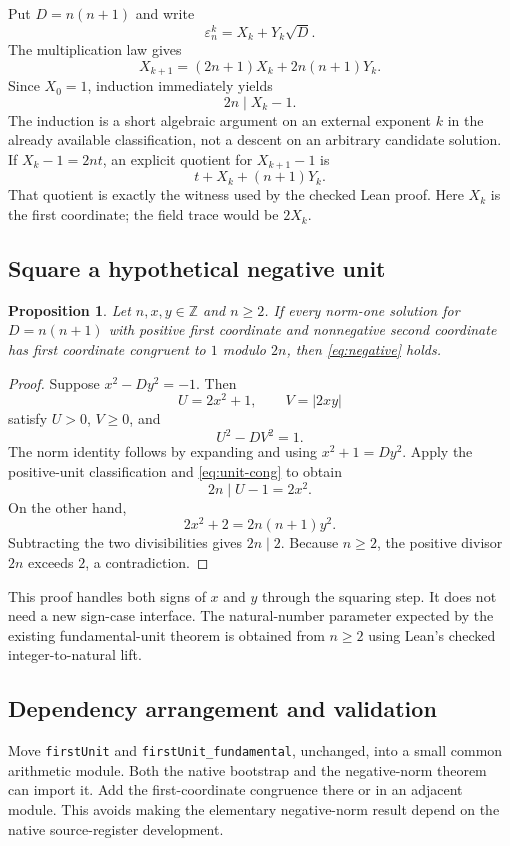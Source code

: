 \documentclass[11pt,letterpaper]{article}
\newcommand{\code}[1]{\nolinkurl{#1}}
\newcommand{\Z}{\mathbb Z}
\newtheorem{proposition}{Proposition}[section]
\begin{document}
Put $D=n(n+1)$ and write
\[
 \varepsilon_n^k=X_k+Y_k\sqrt D.
\]
The multiplication law gives
\[
 X_{k+1}=(2n+1)X_k+2n(n+1)Y_k.
\]
Since $X_0=1$, induction immediately yields
\begin{equation}
 2n\mid X_k-1. \label{eq:unit-cong}
\end{equation}
The induction is a short algebraic argument on an external exponent $k$ in the already available classification, not a descent on an arbitrary candidate solution. If $X_k-1=2nt$, an explicit quotient for $X_{k+1}-1$ is
\[
 t+X_k+(n+1)Y_k.
\]
That quotient is exactly the witness used by the checked Lean proof. Here $X_k$ is the first coordinate; the field trace would be $2X_k$.

\subsection{Square a hypothetical negative unit}

\begin{proposition}
Let $n,x,y\in\Z$ and $n\ge2$. If every norm-one solution for $D=n(n+1)$ with positive first coordinate and nonnegative second coordinate has first coordinate congruent to $1$ modulo $2n$, then \eqref{eq:negative} holds.
\end{proposition}
\begin{proof}
Suppose $x^2-Dy^2=-1$. Then
\[
 U=2x^2+1,\qquad V=|2xy|
\]
satisfy $U>0$, $V\ge0$, and
\[
 U^2-DV^2=1.
\]
The norm identity follows by expanding and using $x^2+1=Dy^2$. Apply the positive-unit classification and \eqref{eq:unit-cong} to obtain
\[
 2n\mid U-1=2x^2.
\]
On the other hand,
\[
 2x^2+2=2n(n+1)y^2.
\]
Subtracting the two divisibilities gives $2n\mid2$. Because $n\ge2$, the positive divisor $2n$ exceeds $2$, a contradiction.
\end{proof}

This proof handles both signs of $x$ and $y$ through the squaring step. It does not need a new sign-case interface. The natural-number parameter expected by the existing fundamental-unit theorem is obtained from $n\ge2$ using Lean's checked integer-to-natural lift.

\subsection{Dependency arrangement and validation}

Move \code{firstUnit} and \code{firstUnit_fundamental}, unchanged, into a small common arithmetic module. Both the native bootstrap and the negative-norm theorem can import it. Add the first-coordinate congruence there or in an adjacent module. This avoids making the elementary negative-norm result depend on the native source-register development.
\end{document}

